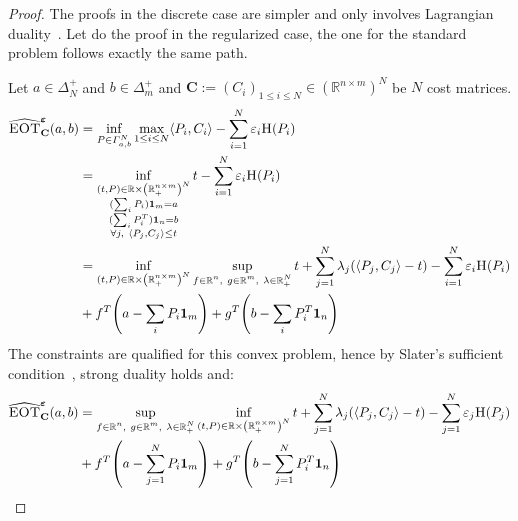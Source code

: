 \begin{proof}
The proofs in the discrete case are simpler and only involves Lagrangian duality~\citep[Chapter 5]{boyd2004convex}. Let do the  proof in the regularized case, the one for the standard problem follows exactly the same path.

Let $a\in\Delta_N^{+}$ and $b\in\Delta^+_m$ and $\mathbf{C}:=(C_i)_{1\leq i\leq N}\in\left(\mathbb{R}^{n\times m}\right)^N$ be $N$ cost matrices. 
\begin{align*}
    \widehat{\MOT}^{\bm{\varepsilon}}_{\mathbf{C}}(a,b)&=\inf_{P\in \Gamma_{a,b}^N} \max_{1\leq i\leq N}\langle P_i,C_i\rangle -\sum_{i=1}^N\varepsilon_i \ent(P_i) \\
    &=\inf\limits_{\substack{(t,P)\in \mathbb{R}\times\left(\mathbb{R}_+^{n\times m}\right)^N\\(\sum_i P_i)\mathbf{1}_m=a\\
     (\sum_i P_i^T)\mathbf{1}_n=b\\
    \forall j,~\langle P_j,C_j\rangle \leq t}}t -\sum_{i=1}^N\varepsilon_i \ent(P_i)\\
    &=\inf\limits_{\substack{(t,P)\in \mathbb{R}\times\left(\mathbb{R}_+^{n\times m}\right)^N}}\sup\limits_{\substack{f\in\mathbb{R}^n,~g\in\mathbb{R}^m,~\lambda\in\mathbb{R}_+^N}} t+\sum_{j=1}^N\lambda_j(\langle P_j,C_j\rangle- t) -\sum_{i=1}^N\varepsilon_i \ent(P_i)\\
    &+f^T\left(a-\sum_i P_i\mathbf{1}_m\right)+g^T\left(b-\sum_i P_i^T\mathbf{1}_n\right)\\
\end{align*}
The constraints are qualified for this convex problem, hence by Slater's sufficient condition~\citep[Section 5.2.3]{boyd2004convex}, strong duality holds and:
\begin{align*}
    \widehat{\MOT}^{\bm{\varepsilon}}_{\mathbf{C}}(a,b)
    &=\sup\limits_{\substack{f\in\mathbb{R}^n,~g\in\mathbb{R}^m,~\lambda\in\mathbb{R}_+^N}}\inf\limits_{\substack{(t,P)\in \mathbb{R}\times\left(\mathbb{R}_+^{n\times m}\right)^N}} t+\sum_{j=1}^N\lambda_j(\langle P_j,C_j\rangle- t) -\sum_{j=1}^N\varepsilon_j \ent(P_j)\\
    &+f^T\left(a-\sum_{j=1}^N P_i\mathbf{1}_m\right)+g^T\left(b-\sum_{j=1}^N P_i^T\mathbf{1}_n\right)\\

\end{align*}
\end{proof}
